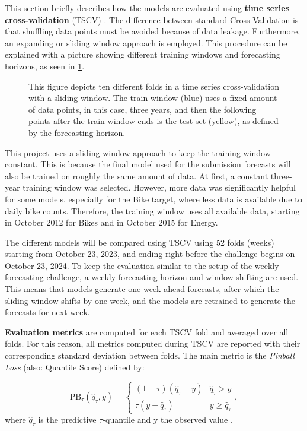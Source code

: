 This section briefly describes how the models are evaluated using \textbf{time series cross-validation} (TSCV) \parencite[Chapter~5.10]{hyndman_forecasting_2021}. The difference between standard Cross-Validation \parencite[241--248]{hastie_elements_2009} is that shuffling data points must be avoided because of data leakage. Furthermore, an expanding or sliding window approach is employed. This procedure can be explained with a picture showing different training windows and forecasting horizons, as seen in \cref{fig:tscv}.
\begin{figure}[htbp]
    \centering
    
    \caption{This figure depicts ten different folds in a time series cross-validation with a sliding window. The train window (blue) uses a fixed amount of data points, in this case, three years, and then the following points after the train window ends is the test set (yellow), as defined by the forecasting horizon.}
    \label{fig:tscv}
\end{figure}
This project uses a sliding window approach to keep the training window constant. This is because the final model used for the submission forecasts will also be trained on roughly the same amount of data. At first, a constant three-year training window was selected. However, more data was significantly helpful for some models, especially for the Bike target, where less data is available due to daily bike counts. Therefore, the training window uses all available data, starting in October 2012 for Bikes and in October 2015 for Energy.

The different models will be compared using TSCV using 52 folds (weeks) starting from October 23, 2023, and ending right before the challenge begins on October 23, 2024. To keep the evaluation similar to the setup of the weekly forecasting challenge, a weekly forecasting horizon and window shifting are used. This means that models generate one-week-ahead forecasts, after which the sliding window shifts by one week, and the models are retrained to generate the forecasts for next week.

\textbf{Evaluation metrics} are computed for each TSCV fold and averaged over all folds. For this reason, all metrics computed during TSCV are reported with their corresponding standard deviation between folds. The main metric is the \textit{Pinball Loss} (also: Quantile Score) defined by:

\begin{equation}
\label{eq:PinballLoss}
\text{PB}_{\tau}(\hat{q}_{\tau}, y) = 
\begin{cases} 
(1 - \tau) (\hat{q}_{\tau} - y) & \hat{q}_{\tau} > y \\
\tau (y - \hat{q}_{\tau}) & y \geq \hat{q}_{\tau}
\end{cases}
,
\end{equation}
where $\hat{q}_\tau$ is the predictive $\tau$-quantile and y the observed value \parencite[Chapter~5.9]{hyndman_forecasting_2021}.

